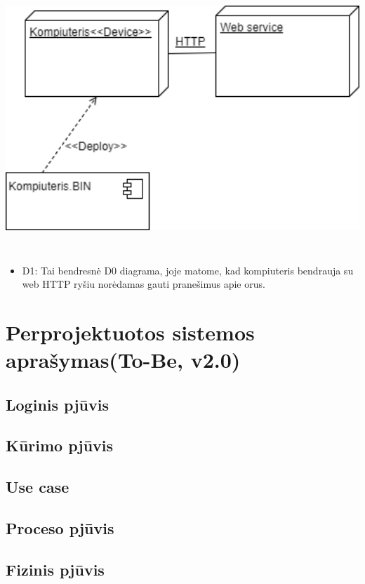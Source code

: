 \documentclass[oneside]{VUMIFPSkursinis}
\begin{document}
	\includegraphics[width=15cm,height=10cm]{Deployment0.png}
	\begin{itemize}
		\item D1: Tai bendresnė D0 diagrama, joje matome, kad kompiuteris bendrauja su web HTTP ryšiu norėdamas gauti pranešimus apie orus.
	\end{itemize}

\section{Perprojektuotos sistemos aprašymas(To-Be, v2.0)}

\subsection{Loginis pjūvis}
\subsection{Kūrimo pjūvis}
\subsection{Use case}
\subsection{Proceso pjūvis}
\subsection{Fizinis pjūvis}



\end{document}
